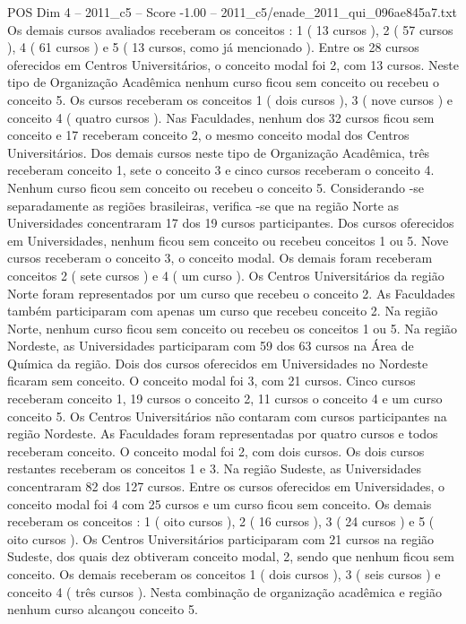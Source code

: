 \begin{textsample}{POS Dim 4 – 2011\_c5 – Score -1.00 – 2011\_c5/enade\_2011\_qui\_096ae845a7.txt}
Os demais cursos avaliados receberam os conceitos : 1 ( 13 cursos ), 2 ( 57 cursos ), 4 ( 61 cursos ) e 5 ( 13 cursos, como já mencionado ).
Entre os 28 cursos oferecidos em Centros Universitários, o conceito modal foi 2, com 13 cursos.
Neste tipo de Organização Acadêmica nenhum curso ficou sem conceito ou recebeu o conceito 5.
Os cursos receberam os conceitos 1 ( dois cursos ), 3 ( nove cursos ) e conceito 4 ( quatro cursos ).
Nas Faculdades, nenhum dos 32 cursos ficou sem conceito e 17 receberam conceito 2, o mesmo conceito modal dos Centros Universitários.
Dos demais cursos neste tipo de Organização Acadêmica, três receberam conceito 1, sete o conceito 3 e cinco cursos receberam o conceito 4.
Nenhum curso ficou sem conceito ou recebeu o conceito 5.
Considerando -se separadamente as regiões brasileiras, verifica -se que na região Norte as Universidades concentraram 17 dos 19 cursos participantes.
Dos cursos oferecidos em Universidades, nenhum ficou sem conceito ou recebeu conceitos 1 ou 5.
Nove cursos receberam o conceito 3, o conceito modal.
Os demais foram receberam conceitos 2 ( sete cursos ) e 4 ( um curso ).
Os Centros Universitários da região Norte foram representados por um curso que recebeu o conceito 2.
As Faculdades também participaram com apenas um curso que recebeu conceito 2.
Na região Norte, nenhum curso ficou sem conceito ou recebeu os conceitos 1 ou 5.
Na região Nordeste, as Universidades participaram com 59 dos 63 cursos na Área de Química da região.
Dois dos cursos oferecidos em Universidades no Nordeste ficaram sem conceito.
O conceito modal foi 3, com 21 cursos.
Cinco cursos receberam conceito 1, 19 cursos o conceito 2, 11 cursos o conceito 4 e um curso conceito 5.
Os Centros Universitários não contaram com cursos participantes na região Nordeste.
As Faculdades foram representadas por quatro cursos e todos receberam conceito.
O conceito modal foi 2, com dois cursos.
Os dois cursos restantes receberam os conceitos 1 e 3.
Na região Sudeste, as Universidades concentraram 82 dos 127 cursos.
Entre os cursos oferecidos em Universidades, o conceito modal foi 4 com 25 cursos e um curso ficou sem conceito.
Os demais receberam os conceitos : 1 ( oito cursos ), 2 ( 16 cursos ), 3 ( 24 cursos ) e 5 ( oito cursos ).
Os Centros Universitários participaram com 21 cursos na região Sudeste, dos quais dez obtiveram conceito modal, 2, sendo que nenhum ficou sem conceito.
Os demais receberam os conceitos 1 ( dois cursos ), 3 ( seis cursos ) e conceito 4 ( três cursos ).
Nesta combinação de organização acadêmica e região nenhum curso alcançou conceito 5.

\end{textsample}
